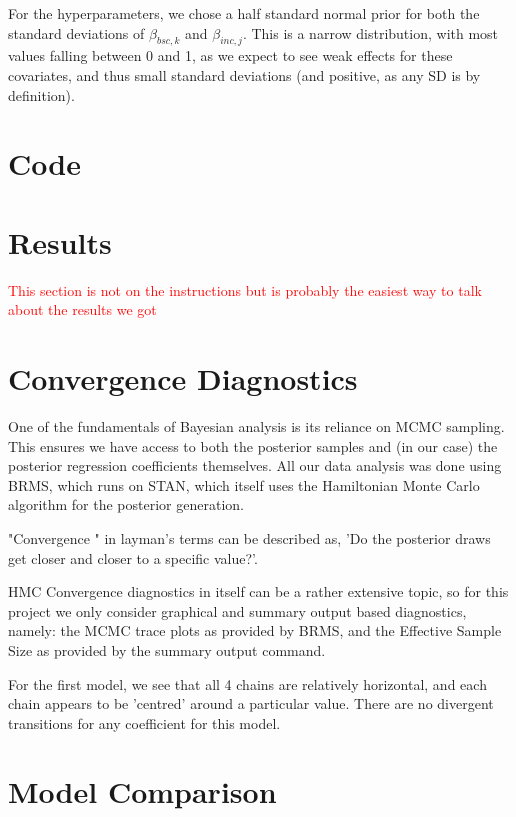 \documentclass[12pt]{article}
\begin{document}
For the hyperparameters, we chose a half standard normal prior for both the standard deviations of $\beta_{bsc,k}$ and $\beta_{inc,j}$. This is a narrow distribution, with most values falling between 0 and 1, as we expect to see weak effects for these covariates, and thus small standard deviations (and positive, as any SD is by definition).









\section{Code}


\section{Results}

\textcolor{red}{This section is not on the instructions but is probably the easiest way to talk about the results we got }




\section{Convergence Diagnostics}

One of the fundamentals of Bayesian analysis is its reliance on MCMC sampling. This ensures we have access to both the posterior samples and (in our case) the posterior regression coefficients themselves. All our data analysis was done using BRMS, which runs on STAN, which itself uses the Hamiltonian Monte Carlo algorithm for the posterior generation. 

"Convergence " in layman's terms can be described as, 'Do the posterior draws get closer and closer to a specific value?'.

HMC Convergence diagnostics in itself can be a rather extensive topic, so for this project we only consider graphical and summary output based diagnostics, namely: the MCMC trace plots as provided by BRMS, and the Effective Sample Size as provided by the summary output command.

For the first model, we see that all 4 chains are relatively horizontal, and each chain appears to be 'centred' around a particular value. There are no divergent transitions for any coefficient for this model. 

\section{Model Comparison}
\end{document}
